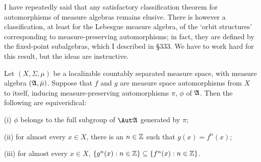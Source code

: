      
\def\chaptername{Automorphisms}
\def\sectionname{Dye's theorem}
     
     
I have repeatedly said that any satisfactory classification theorem for
automorphisms of measure algebras remains elusive.   There is however a
classification, at least for the Lebesgue measure algebra, of the
`orbit structures' corresponding to measure-preserving automorphisms;
in fact, they are defined by the fixed-point subalgebras, which I
described in \S333.   We have to work hard for this result,
but the ideas are instructive.
     
 Let $(X,\Sigma,\mu)$ be a
localizable countably separated
measure space, with measure algebra
$(\frak A,\bar\mu)$.   Suppose that
$f$ and $g$ are measure space automorphisms from $X$ to itself, inducing
measure-preserving automorphisms $\pi$, $\phi$ of $\frak A$.   Then the
following are equiveridical:
     
(i) $\phi$ belongs to the full subgroup of $\Aut\frak A$ generated by
$\pi$;
     
(ii) for almost every $x\in X$, there is an $n\in\Bbb Z$ such that
$g(x)=f^n(x)$;
     
(iii) for almost every $x\in X$,
$\{g^n(x):n\in\Bbb Z\}\subseteq\{f^n(x):n\in\Bbb Z\}$.
     
